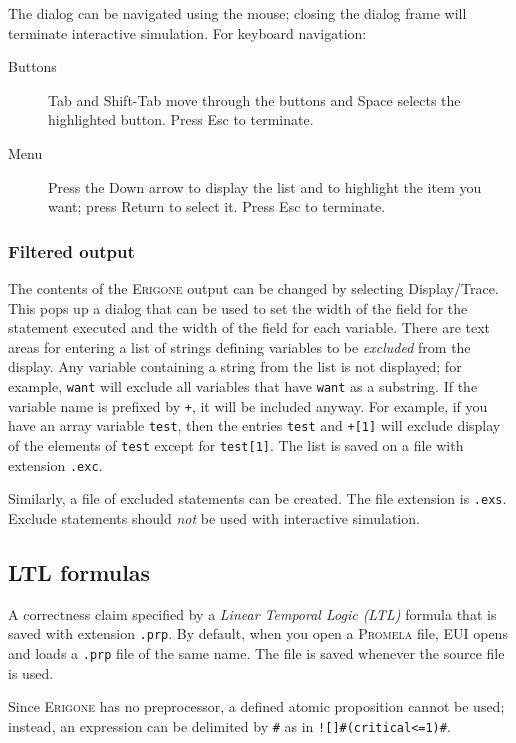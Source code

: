 \documentclass[11pt]{article}
\newcommand{\eri}{\textsc{Erigone}}
\newcommand{\prm}{\textsc{Promela}}
\newcommand{\eui}{\textsc{EUI}}
\newcommand{\p}[1]{\texttt{#1}}
\newcommand{\bu}[1]{\textsf{#1}}
\begin{document}
The dialog can be navigated using the mouse; closing the dialog frame
will terminate interactive simulation. For keyboard navigation:
\begin{description}
\item[Buttons] \bu{Tab} and \bu{Shift-Tab} move through the buttons
and \bu{Space} selects the highlighted button. Press \bu{Esc} to terminate.
\item[Menu] Press the \bu{Down arrow} to display the list and to highlight the
item you want; press \bu{Return} to select it. Press \bu{Esc} to terminate.
\end{description}

\subsubsection{Filtered output}\label{s.filter}
The contents of the \eri{} output can be changed by selecting 
\bu{Display/Trace}. This pops up a dialog that can be used to set the
width of the field for the statement executed and the width of the field
for each variable. There are text areas for entering a list of strings defining 
variables to be \emph{excluded} from the display. Any variable containing 
a string from the list is not displayed; for example, \p{want} will 
exclude all variables that have \p{want} as a substring. If the variable name is 
prefixed by \p{+}, it will be included anyway. For example, if you have an 
array variable \p{test}, then the entries \p{test} and \p{+[1]} will 
exclude display of the elements of \p{test} except for \p{test[1]}. The 
list is saved on a file with extension \p{.exc}.

Similarly, a file of excluded statements can be created. The file 
extension is \p{.exs}. \bu{Exclude statements} should \emph{not} be used with 
interactive simulation.

\subsection{LTL formulas}
A correctness claim specified by a \emph{Linear Temporal Logic (LTL)}
formula that is saved with extension \p{.prp}.
By default, when you open a \prm{} file,
\eui{} opens and loads a \p{.prp} file of the same name.
The file is saved whenever the source file is used.

Since \eri{} has no preprocessor, a defined atomic proposition cannot
be used; instead, an expression can be delimited by \verb+#+ as in
\verb+![]#(critical<=1)#+.
\end{document}
